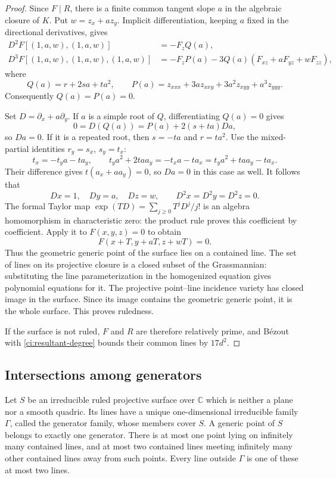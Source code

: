 \begin{proof}
Since $F\mid R$, there is a finite common tangent slope $a$ in the
algebraic closure of $K$.  Put $w=z_x+az_y$.  Implicit
differentiation, keeping $a$ fixed in the directional derivatives,
gives
\begin{align*}
 D^2F[(1,a,w),(1,a,w)]&=-F_z Q(a),\\
 D^3F[(1,a,w),(1,a,w),(1,a,w)]
 &=-F_z P(a)-3Q(a)(F_{xz}+aF_{yz}+wF_{zz}),
 \end{align*}
where
\[
 Q(a)=r+2sa+ta^2,\qquad
 P(a)=z_{xxx}+3az_{xxy}+3a^2z_{xyy}+a^3z_{yyy}.
\]
Consequently $Q(a)=P(a)=0$.

Set $D=\partial_x+a\partial_y$.  If $a$ is a simple root of $Q$,
differentiating $Q(a)=0$ gives
\[
 0=D(Q(a))=P(a)+2(s+ta)Da,
\]
so $Da=0$.  If it is a repeated root, then $s=-ta$ and $r=ta^2$.
Use the mixed-partial identities $r_y=s_x$, $s_y=t_x$:
\[
 t_x=-t_ya-ta_y,\qquad
 t_ya^2+2taa_y=-t_xa-ta_x
             =t_ya^2+taa_y-ta_x.
\]
Their difference gives $t(a_x+aa_y)=0$, so $Da=0$ in this case
as well.  It follows that
\[
 Dx=1,\quad Dy=a,\quad Dz=w,\qquad
 D^2x=D^2y=D^2z=0.
\]
The formal Taylor map
$\exp(TD)=\sum_{j\ge0}T^jD^j/j!$ is an algebra homomorphism in
characteristic zero: the product rule proves this coefficient by
coefficient.  Apply it to $F(x,y,z)=0$ to obtain
\[
 F(x+T,y+aT,z+wT)=0.
\]
Thus the geometric generic point of the surface lies on a contained
line.  The set of lines on its projective closure is a closed subset
of the Grassmannian: substituting the line parameterization in the
homogenized equation gives polynomial equations for it.  The
projective point--line incidence variety has closed image in the
surface.  Since its image contains the geometric generic point,
it is the whole surface.  This proves ruledness.

If the surface is not ruled, $F$ and $R$ are therefore relatively
prime, and B\'ezout with \eqref{ci:resultant-degree} bounds their
common lines by $17d^2$.
\end{proof}

\subsection{Intersections among generators}

\begin{lemma}\label{ci:ruled-structure}
Let $S$ be an irreducible ruled projective surface over $\mathbb C$
which is neither a plane nor a smooth quadric.  Its lines have a
unique one-dimensional irreducible family $\Gamma$, called the
generator family, whose members cover $S$.  A generic point of $S$
belongs to exactly one generator.  There is at most one point lying
on infinitely many contained lines, and at most two contained lines
meeting infinitely many other contained lines away from such points.
Every line outside $\Gamma$ is one of these at most two lines.
\end{lemma}

